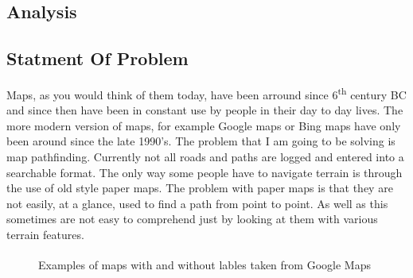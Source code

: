 \begin{flushleft}
    \section{Analysis} 
        \subsection{Statment Of Problem}
        \large
        \bk
        Maps, as you would think of them today, have been arround since 6\textsuperscript{th} century BC and since then have been in constant use by people in their day to day lives. 
        The more modern version of maps, for example Google maps or Bing maps have only been around since the late 1990's. The problem that I am going to be solving is map pathfinding.
        Currently not all roads and paths are logged and entered into a searchable format. The only way some people have to navigate terrain is through the use of old style paper maps.
        The problem with paper maps is that they are not easily, at a glance, used to find a path from point to point. As well as this sometimes are not easy to comprehend just by looking 
        at them with various terrain features. \\
        
        \bk
        \begin{figure}[h]
            \centering
            \qquad
            \caption*{Examples of maps with and without lables taken from Google Maps\textsuperscript{\textcopyright}}
        \end{figure}
        \bk


\end{flushleft}
